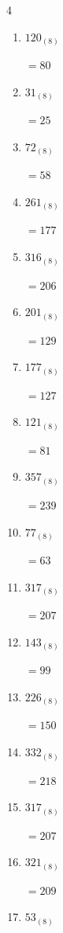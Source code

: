 \begin{multicols}{4}
\begin{enumerate}
  \item $120_{(8)}$

        $=80$

  \item $31_{(8)}$

        $=25$

  \item $72_{(8)}$

        $=58$

  \item $261_{(8)}$

        $=177$

  \item $316_{(8)}$

        $=206$

  \item $201_{(8)}$

        $=129$

  \item $177_{(8)}$

        $=127$

  \item $121_{(8)}$

        $=81$

  \item $357_{(8)}$

        $=239$

  \item $77_{(8)}$

        $=63$

  \item $317_{(8)}$

        $=207$

  \item $143_{(8)}$

        $=99$

\columnbreak %

  \item $226_{(8)}$

        $=150$

  \item $332_{(8)}$

        $=218$

  \item $317_{(8)}$

        $=207$

  \item $321_{(8)}$

        $=209$

  \item $53_{(8)}$


\end{enumerate}
\end{multicols}
